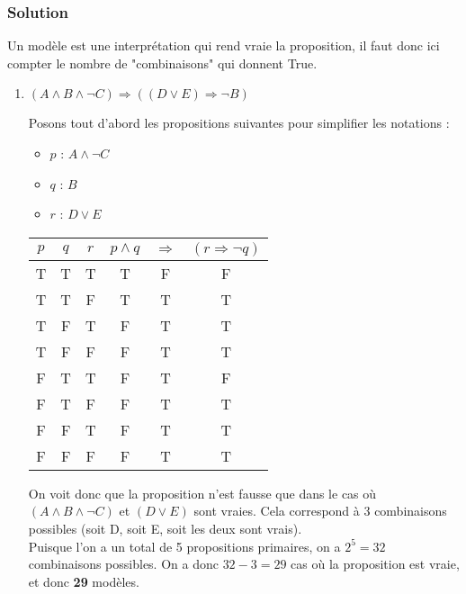 \subsubsection*{Solution}


    Un modèle est une interprétation qui rend vraie la proposition, il faut donc ici compter le nombre de "combinaisons" qui donnent True.

\begin{enumerate}
	\item $(A \land B \land \neg C) \Rightarrow ((D \lor E) \Rightarrow \neg B)$

    Posons tout d'abord les propositions suivantes pour simplifier les notations :
    \begin{itemize}
        \item $p$ : $A \land \neg C$
        \item $q$ : $B$
        \item $r$ : $D \lor E$
    \end{itemize}

    \begin{center}
    	\begin{tabular}{ccc|ccc}
    		$p$ & $q$ & $r$ & $p \land q$ & $\Rightarrow$ & $(r \Rightarrow \neg q)$\\
    		\hline
    		T & T & T & T & \color{red}F & F \\
    		T & T & F & T & \color{red}T & T \\
    		T & F & T & F & \color{red}T & T \\
    		T & F & F & F & \color{red}T & T \\
    		F & T & T & F & \color{red}T & F \\
    		F & T & F & F & \color{red}T & T \\
    		F & F & T & F & \color{red}T & T \\
    		F & F & F & F & \color{red}T & T \\
    	\end{tabular}
    \end{center}

    On voit donc que la proposition n'est fausse que dans le cas où $(A \land B \land \neg C)$ et $(D \lor E)$ sont vraies.
    Cela correspond à 3 combinaisons possibles (soit D, soit E, soit les deux sont vrais).\\
    Puisque l'on a un total de 5 propositions primaires, on a $2^5 = 32$ combinaisons possibles.
    On a donc $32-3 = 29$ cas où la proposition est vraie, et donc \textbf{29} modèles.\\


\end{enumerate}
